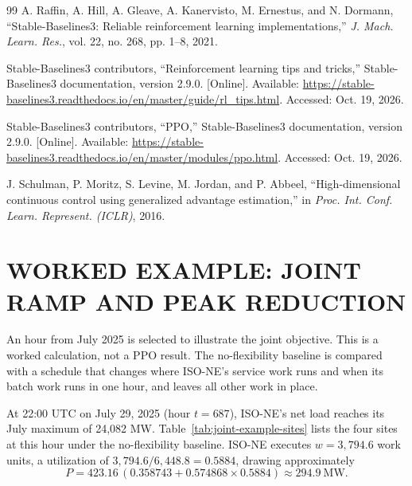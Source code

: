 \documentclass{UNCC-thesis}
\begin{document}
\begin{thebibliography}{99}
A. Raffin, A. Hill, A. Gleave, A. Kanervisto, M. Ernestus, and N. Dormann,
``Stable-Baselines3: Reliable reinforcement learning implementations,''
\emph{J. Mach. Learn. Res.}, vol. 22, no. 268, pp. 1--8, 2021.

Stable-Baselines3 contributors, ``Reinforcement learning tips and tricks,''
Stable-Baselines3 documentation, version 2.9.0. [Online]. Available:
\url{https://stable-baselines3.readthedocs.io/en/master/guide/rl_tips.html}.
Accessed: Oct. 19, 2026.

Stable-Baselines3 contributors, ``PPO,'' Stable-Baselines3 documentation,
version 2.9.0. [Online]. Available:
\url{https://stable-baselines3.readthedocs.io/en/master/modules/ppo.html}.
Accessed: Oct. 19, 2026.

J. Schulman, P. Moritz, S. Levine, M. Jordan, and P. Abbeel,
``High-dimensional continuous control using generalized advantage
estimation,'' in \emph{Proc. Int. Conf. Learn. Represent. (ICLR)}, 2016.

\end{thebibliography}

\clearpage
{}
\renewcommand{\chaptertitlename}{APPENDIX}
\appendix

\chapter{WORKED EXAMPLE: JOINT RAMP AND PEAK REDUCTION}
\label{subsec:problem-worked-joint}

An hour from July 2025 is selected to illustrate the joint
objective. This is a worked calculation, not a PPO result. The
no-flexibility baseline is compared with a schedule that changes where ISO-NE's service
work runs and when its batch work runs in one hour, and leaves all other work in place.

At 22:00 UTC on July 29, 2025 (hour \(t=687\)), ISO-NE's net load reaches its July maximum of
24,082 MW. Table~\ref{tab:joint-example-sites} lists the four sites at this hour under
the no-flexibility baseline. ISO-NE executes \(w=3{,}794.6\) work units, a utilization of
\(3{,}794.6/6{,}448.8=0.5884\), drawing approximately
\begin{equation*}
  P = 423.16\,(0.358743 + 0.574868 \times 0.5884)
  \approx 294.9\ \mathrm{MW}.
\end{equation*}
\end{document}
